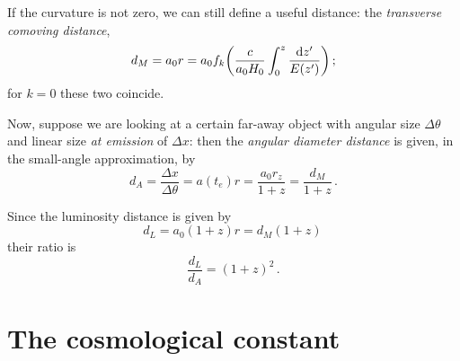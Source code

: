 \documentclass[main.tex]{subfiles}
\begin{document}
If the curvature is not zero, we can still define a useful distance: the \emph{transverse comoving distance}, 
%
\begin{align}
d_M = a_0 r = a_0 f_k \qty(\frac{c}{a_0 H_0 } \int_0^z \frac{\dd{z'}   }{E(z')})
\,;
\end{align}
%
for \(k=0\) these two coincide.



Now,  suppose we are looking at a certain far-away object with angular size \(\Delta \theta \) and linear size \emph{at emission} of \(\Delta x\): then the \emph{angular diameter distance} is given, in the small-angle approximation, by
%
\begin{equation}
d_A = \frac{ \Delta x}{\Delta \theta } = a(t_e) r
= \frac{a_0 r_z}{1+z} = \frac{d_M}{1+z}
\,.
\end{equation}

Since the luminosity distance is given by 
%
\begin{equation}
 d_L = a_0 (1+z) r = d_M (1+z)
\,
\end{equation}
%
their ratio is  
%
\begin{equation}
  \frac{d_L}{d_A} = (1+z)^2
\,.
\end{equation}



\section{The cosmological constant} \label{sec:cosmological-constant}
\end{document}
